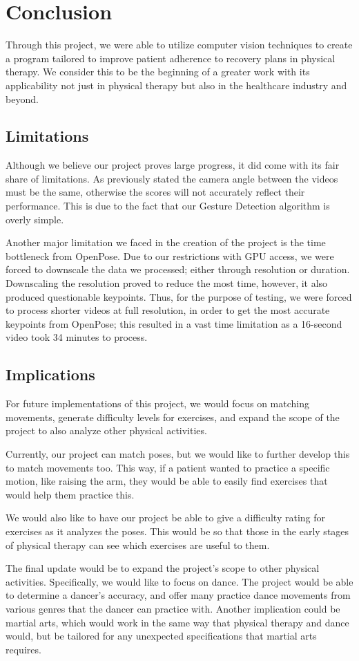 \section{Conclusion}
\label{sec:conclusion}

\indent Through this project, we were able to utilize computer vision 
techniques to create a program tailored to improve patient adherence to 
recovery plans in physical therapy. We consider this to be the beginning 
of a greater work with its applicability not just in physical therapy 
but also in the healthcare industry and beyond.

\subsection{Limitations}
\indent Although we believe our project proves large progress, it did 
come with its fair share of limitations. As previously stated the camera 
angle between the videos must be the same, otherwise the scores will not 
accurately reflect their performance. This is due to the fact that our 
Gesture Detection algorithm is overly simple. 

\indent Another major limitation we faced in the creation of the project 
is the time bottleneck from OpenPose. Due to our restrictions with GPU 
access, we were forced to downscale the data we processed; either 
through resolution or duration. Downscaling the resolution proved to 
reduce the most time, however, it also produced questionable keypoints. 
Thus, for the purpose of testing, we were forced to process shorter 
videos at full resolution, in order to get the most accurate keypoints 
from OpenPose; this resulted in a vast time limitation as a 16-second 
video took 34 minutes to process.

\subsection{Implications}
\indent For future implementations of this project, we would focus on 
matching movements, generate difficulty levels for exercises, and expand 
the scope of the project to also analyze other physical activities. 

\indent Currently, our project can match poses, but we would like 
to further develop this to match movements too. This way, if a patient 
wanted to practice a specific motion, like raising the arm, they would 
be able to easily find exercises that would help them practice this. 

\indent We would also like to have our project be able to give a 
difficulty rating for exercises as it analyzes the poses. This would be 
so that those in the early stages of physical therapy can see which 
exercises are useful to them. 

\indent The final update would be to expand the project’s scope to 
other physical activities. Specifically, we would like to focus on 
dance. The project would be able to determine a dancer’s accuracy, and 
offer many practice dance movements from various genres that the 
dancer can practice with. Another implication could be martial arts, 
which would work in the same way that physical therapy and dance would, 
but be tailored for any unexpected specifications that martial arts 
requires. 